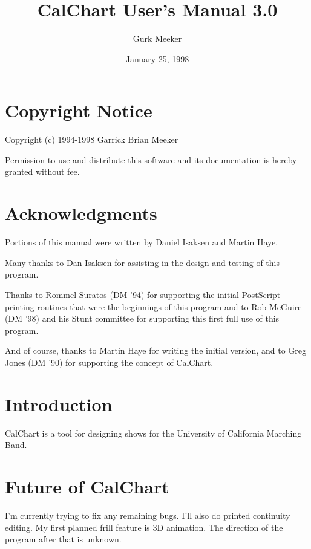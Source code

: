 \title{CalChart User's Manual 3.0}
\author{Gurk Meeker}
\date{January 25, 1998}
\makeindex

\maketitle
\tableofcontents

\chapter*{Copyright Notice}\label{copyright}

Copyright (c) 1994-1998 Garrick Brian Meeker

Permission to use and distribute this software and its documentation is
hereby granted without fee.

\chapter*{Acknowledgments}\label{acknowledge}

Portions of this manual were written by Daniel Isaksen and Martin Haye.

Many thanks to Dan Isaksen for assisting in the design and testing of
this program.

Thanks to Rommel Suratos (DM '94) for supporting the initial PostScript
printing routines that were the beginnings of this program and to Rob
McGuire (DM '98) and his Stunt committee for supporting this first full
use of this program.

And of course, thanks to Martin Haye for writing the initial version,
and to Greg Jones (DM '90) for supporting the concept of CalChart.

\chapter{Introduction}

CalChart is a tool for designing shows for the University of California
Marching Band.






\chapter{Future of CalChart}\label{future}

I'm currently trying to fix any remaining bugs.  I'll also do printed
continuity editing.  My first planned frill feature is 3D animation.
The direction of the program after that is unknown.


